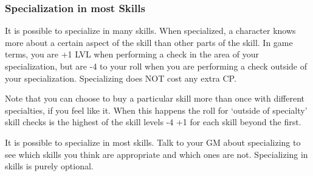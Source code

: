 \documentclass[twoside]{book}
\begin{document}
\subsubsection{Specialization in most Skills}
     It is possible to specialize in many skills. When
                 specialized, a character knows more about a certain
                 aspect of the skill than other parts of the skill. In
                 game terms, you are +1 LVL when performing a check in
                 the area of your specialization, but are -4 to your roll
                 when you are performing a check outside of your
                 specialization. Specializing does NOT cost any extra CP.
                 
   Note that you can choose to buy a particular skill
                 more than once with different specialties, if you feel
                 like it. When this happens the roll for `outside
                 of specialty' skill checks is the highest of the
                 skill levels -4 +1 for each skill beyond the first.
                 
   It is possible to specialize in most skills. Talk
                 to your GM about specializing to see which skills you
                 think are appropriate and which ones are not.  Specializing in skills is purely optional. 
\end{document}
